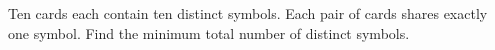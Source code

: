 Ten cards each contain ten distinct symbols. Each pair of cards shares exactly one symbol. Find the minimum total number of distinct symbols.
